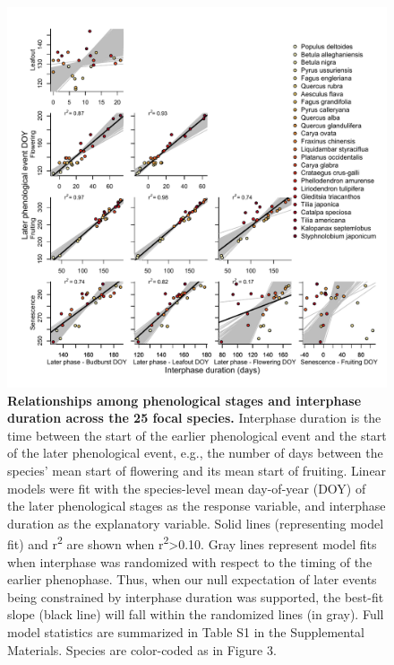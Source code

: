 \documentclass{article}
\begin{document}
\begin{figure}[h]
  \centering
  \includegraphics{../analyses/figures/Hyp2.pdf}
  \caption{\textbf{Relationships among phenological stages and interphase duration across the 25 focal species.} Interphase duration is the time between the start of the earlier phenological event and the start of the later phenological event, e.g., the number of days between the species' mean start of flowering and its mean start of fruiting. Linear models were fit with the species-level mean day-of-year (DOY) of the later phenological stages as the response variable, and interphase duration as the explanatory variable. Solid lines (representing model fit) and r\textsuperscript{2} are shown when r\textsuperscript{2}>0.10. Gray lines represent model fits when interphase was randomized with respect to the timing of the earlier phenophase. Thus, when our null expectation of later events being constrained by interphase duration was supported, the best-fit slope (black line) will fall within the randomized lines (in gray). Full model statistics are summarized in Table S1 in the Supplemental Materials. Species are color-coded as in Figure 3.}
    \label{fig:inter}
   \end{figure}

\end{document}
